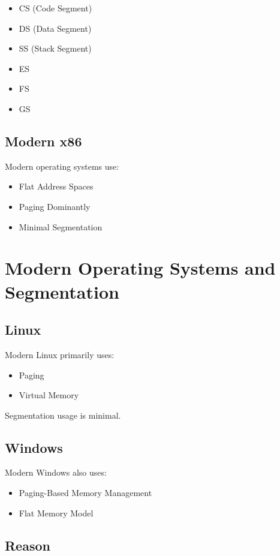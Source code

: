 \begin{itemize}
\item CS (Code Segment)
\item DS (Data Segment)
\item SS (Stack Segment)
\item ES
\item FS
\item GS
\end{itemize}

\subsection{Modern x86}

Modern operating systems use:

\begin{itemize}
\item Flat Address Spaces
\item Paging Dominantly
\item Minimal Segmentation
\end{itemize}

\section{Modern Operating Systems and Segmentation}

\subsection{Linux}

Modern Linux primarily uses:

\begin{itemize}
\item Paging
\item Virtual Memory
\end{itemize}

Segmentation usage is minimal.

\subsection{Windows}

Modern Windows also uses:

\begin{itemize}
\item Paging-Based Memory Management
\item Flat Memory Model
\end{itemize}

\subsection{Reason}

